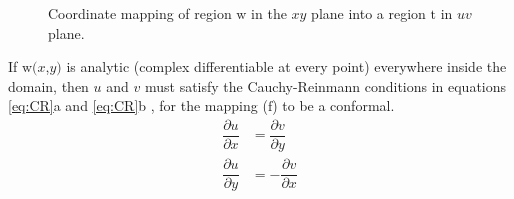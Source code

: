 \begin{figure} [t]
	\centering
	\noindent
	\hspace*{\fill}%
	\hspace*{\fill}%
	\qquad
	\hspace*{\fill}%
	\caption[Coordinate mapping of region $\mathrm{w} = f(x,y)$ into a region $t = f(u,v)$.]{Coordinate mapping of region $\mathrm{w}$ in the $xy$ plane into a region $\mathrm{t}$ in $uv$ plane.}
	\label{fig:coordinatemapping}
\end{figure}

If $\mathrm{w}(x$,$y)$ is analytic (complex differentiable at every point) everywhere inside the domain, then $u$ and $v$ must satisfy the Cauchy-Reinmann conditions in equations \ref{eq:CR}a and \ref{eq:CR}b \cite{Saks1952}, for the mapping ($\mathrm{f}$) to be a conformal.
\begin{subequations} \label{eq:CR}
	
	\begin{align}
		\dfrac{\partial u}{\partial x} &= \dfrac{\partial v}{\partial y}\\
		\dfrac{\partial u}{\partial y} &= -\dfrac{\partial v}{\partial x}
	\end{align} 
\end{subequations}

